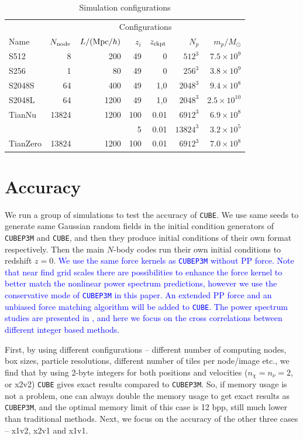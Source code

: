 \documentclass[10pt,twocolumn,preprint]{emulateapj}
\newcommand{\Msun}{M_\odot}
\newcommand{\tcb}{\textcolor{blue}}
\begin{document}
\begin{table}[]
\centering
\caption{Simulation configurations}
\label{t.sim}
\begin{tabular}{lrrrrrr}
\hline
& \multicolumn{6}{c}{Configurations}\\
\cline{2-7}
Name  & $N_{\rm node}$ & $L/({\rm Mpc}/h)$ & $z_i$ & $z_{\rm ckpt}$ & $N_p$ & $m_p/\Msun$ \\
\hline
S512   & 8     & 200   & 49 & 0    & $512^3$  & $7.5\times 10^9$    \\
S256   & 1     & 80    & 49 & 0    & $256^3$  & $3.8\times 10^9$    \\
S2048S & 64    & 400   & 49 & 1,0  & $2048^3$ & $9.4\times 10^8$    \\
S2048L & 64    & 1200  & 49 & 1,0  & $2048^3$ & $2.5\times 10^{10}$ \\
\hline
TianNu & 13824 & 1200  & 100& 0.01 & $6912^3$ & $6.9\times 10^8$\\
       &       &       & 5  & 0.01 & $13824^3$& $3.2\times 10^5$\\
TianZero & 13824 & 1200 & 100& 0.01 & $6912^3$ & $7.0\times 10^8$\\
\hline
\end{tabular}
\end{table}

\section{Accuracy}\label{s.results}
We run a group of simulations to test the accuracy of {\tt CUBE}. We use same seeds to generate same Gaussian random fields in the initial condition generators of {\tt CUBEP3M} and {\tt CUBE}, and then they produce initial conditions of their own format respectively. Then the main $N$-body codes run their own initial conditions to redshift $z=0$. \tcb{We use the same force kernels as {\tt CUBEP3M} without PP force. Note that near find grid scales there are possibilities to enhance the force kernel to better match the nonlinear power spectrum predictions, however we use the conservative mode of {\tt CUBEP3M} in this paper. An extended PP force and an unbiased force matching algorithm will be added to {\tt CUBE}. The power spectrum studies are presented in \citet{2013MNRAS.436..540H}, and here we focus on the cross correlations between different integer based methods.}

First, by using different configurations -- different number of computing nodes, box sizes, particle resolutions, different number of tiles per node/image etc., we find that by using 2-byte integers for both positions and velocities ($n_\chi=n_\nu=2$, or x2v2) {\tt CUBE} gives exact results compared to {\tt CUBEP3M}. So, if memory usage is not a problem, one can always double the memory usage to get exact results as {\tt CUBEP3M}, and the optimal memory limit of this case is 12 bpp, still much lower than traditional methods. Next, we focus on the accuracy of the other three cases -- x1v2, x2v1 and x1v1.
\end{document}
